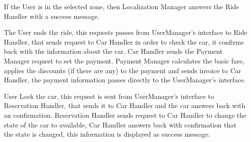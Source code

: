 		If the User is in the selected zone, then Localization Manager answers the Ride Handler with a success message.  
		
		The User ends the ride, this requests passes from UserManager's interface to Ride Handler, that sends request to Car Handler in order to check the car,   it confirms back with the information about the car. Car Handler sends the Payment Manager request to set the payment. Payment Manager calculates the basic fare, applies the discounts (if there are any) to the payment and sends invoice to Car Handler, the payment information passes directly to the UserManager's interface. 
		
		
		User Lock the car, this request is sent from UserManager's interface to Reservation Handler, that sends it to Car Handler and the car answers back with an confirmation. Reservation Handler sends request to Car Handler to change the state of the car to available, Car Handler answers back with confirmation that the state is changed, this information is displayed as success message.    
